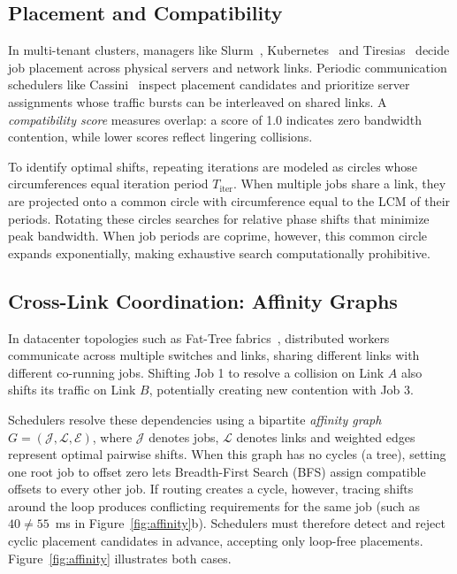 \documentclass[conference]{IEEEtran}
\begin{document}
\subsection{Placement and Compatibility}

In multi-tenant clusters, managers like Slurm~\cite{slurm}, Kubernetes~\cite{kubernetes} and Tiresias~\cite{tiresias} decide job placement across physical servers and network links. Periodic communication schedulers like Cassini~\cite{cassini} inspect placement candidates and prioritize server assignments whose traffic bursts can be interleaved on shared links. A \emph{compatibility score} measures overlap: a score of 1.0 indicates zero bandwidth contention, while lower scores reflect lingering collisions.

To identify optimal shifts, repeating iterations are modeled as circles whose circumferences equal iteration period $T_{\text{iter}}$. When multiple jobs share a link, they are projected onto a common circle with circumference equal to the LCM of their periods. Rotating these circles searches for relative phase shifts that minimize peak bandwidth. When job periods are coprime, however, this common circle expands exponentially, making exhaustive search computationally prohibitive.

\subsection{Cross-Link Coordination: Affinity Graphs}

In datacenter topologies such as Fat-Tree fabrics~\cite{fattree}, distributed workers communicate across multiple switches and links, sharing different links with different co-running jobs. Shifting Job 1 to resolve a collision on Link $A$ also shifts its traffic on Link $B$, potentially creating new contention with Job 3.

Schedulers resolve these dependencies using a bipartite \emph{affinity graph} $G = (\mathcal{J}, \mathcal{L}, \mathcal{E})$, where $\mathcal{J}$ denotes jobs, $\mathcal{L}$ denotes links and weighted edges represent optimal pairwise shifts. When this graph has no cycles (a tree), setting one root job to offset zero lets Breadth-First Search (BFS) assign compatible offsets to every other job. If routing creates a cycle, however, tracing shifts around the loop produces conflicting requirements for the same job (such as $40 \neq 55$~ms in Figure~\ref{fig:affinity}b). Schedulers must therefore detect and reject cyclic placement candidates in advance, accepting only loop-free placements. Figure~\ref{fig:affinity} illustrates both cases.
\end{document}
